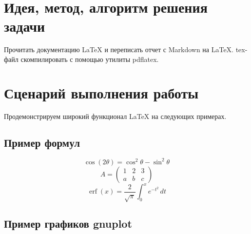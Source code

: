 \documentclass[12pt, letterpaper]{article}
\DeclareMathOperator\erf{erf}
\begin{document}
\section{Идея, метод, алгоритм решения задачи}
Прочитать документацию \LaTeX{} и переписать отчет с Markdown на \LaTeX{}. tex-файл скомпилировать с помощью утилиты pdflatex.
\section{Сценарий выполнения работы}
Продемонстрируем широкий функционал \LaTeX{} на следующих примерах.
\subsection{Пример формул}
\[\cos (2\theta) = \cos^2 \theta - \sin^2 \theta\]
\[A=
\begin{pmatrix}
1 & 2 & 3\\
a & b & c
\end{pmatrix}\]
\[
\erf(x)=\frac{2}{\sqrt{\pi}}\int_{0}^{x}e^{-t^{2}}\, dt
\]
\subsection{Пример графиков gnuplot}

\end{document}
